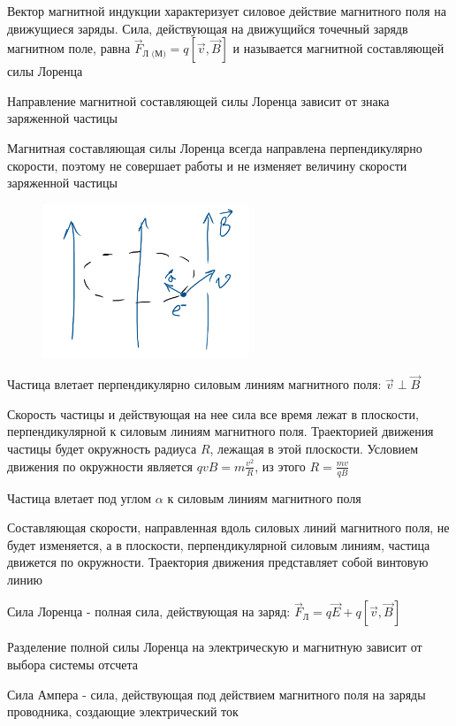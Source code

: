 \documentclass[12pt]{article}
\begin{document}
Вектор магнитной индукции характеризует силовое действие магнитного поля на движущиеся заряды. 
Сила, действующая на движущийся точечный зарядв магнитном поле, равна $\vec{F}_{\text{Л (М)}} = q [\vec{v}, \vec{B}]$
и называется магнитной составляющей силы Лоренца

Направление магнитной составляющей силы Лоренца зависит от знака заряженной частицы

Магнитная составляющая силы Лоренца всегда направлена перпендикулярно скорости, поэтому не совершает работы и не изменяет величину скорости заряженной частицы

\begin{figure}
    \includegraphics[width=6.2cm]{physics2/images/physics2_2025_02_24_1}
\end{figure}

\Ex Частица влетает перпендикулярно силовым линиям магнитного поля: $\vec{v} \perp \vec{B}$

Скорость частицы и действующая на нее сила все время лежат в плоскости, перпендикулярной к силовым линиям магнитного поля. 
Траекторией движения частицы будет окружность радиуса $R$, лежащая в этой плоскости. 
Условием движения по окружности является $q v B = m\frac{v^2}{R}$, из этого $R = \frac{mv}{qB}$


\Ex Частица влетает под углом $\alpha$ к силовым линиям магнитного поля

Составляющая скорости, направленная вдоль силовых линий магнитного поля, не будет изменяется, 
а в плоскости, перпендикулярной силовым линиям, частица движется по окружности. Траектория движения 
представляет собой винтовую линию

\Mem Сила Лоренца - полная сила, действующая на заряд: $\vec{F}_\text{Л} = q\vec{E} + q[\vec{v}, \vec{B}]$

Разделение полной силы Лоренца на электрическую и магнитную зависит от выбора системы отсчета

\Def Сила Ампера - сила, действующая под действием магнитного поля на заряды проводника, создающие электрический ток
\end{document}
